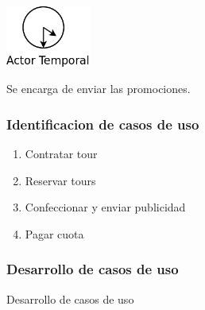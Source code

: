 \documentclass[12pt,a4paper,titlepage,oneside]{article}
\begin{document}
\vspace*{1.5cm}

\begin{minipage}[b]{0.2\linewidth}\centering
	\includegraphics[height=2cm]{actor_temporal}
\end{minipage}
\begin{minipage}[b]{0.8\linewidth}\centering
	\begin{flushleft}
	Se encarga de enviar las promociones. \\
	\end{flushleft}
\end{minipage}

\vspace*{1.5cm}

\newpage

\subsubsection{Identificacion de casos de uso}

\begin{enumerate}
\item Contratar tour
\item Reservar tours
\item Confeccionar y enviar publicidad
\item Pagar cuota
\end{enumerate}


\subsubsection{Desarrollo de casos de uso}

Desarrollo de casos de uso
\\\
\end{document}
